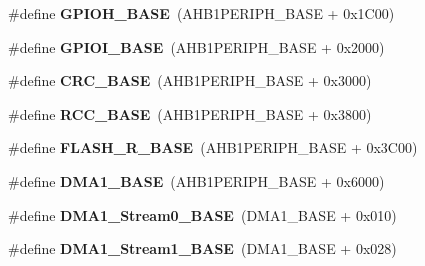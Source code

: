 \begin{DoxyCompactItemize}
\item 
\hypertarget{group___peripheral__memory__map_gaee4716389f3a1c727495375b76645608}{\#define {\bfseries G\-P\-I\-O\-H\-\_\-\-B\-A\-S\-E}~(A\-H\-B1\-P\-E\-R\-I\-P\-H\-\_\-\-B\-A\-S\-E + 0x1\-C00)}\label{group___peripheral__memory__map_gaee4716389f3a1c727495375b76645608}

\item 
\hypertarget{group___peripheral__memory__map_ga50acf918c2e1c4597d5ccfe25eb3ad3d}{\#define {\bfseries G\-P\-I\-O\-I\-\_\-\-B\-A\-S\-E}~(A\-H\-B1\-P\-E\-R\-I\-P\-H\-\_\-\-B\-A\-S\-E + 0x2000)}\label{group___peripheral__memory__map_ga50acf918c2e1c4597d5ccfe25eb3ad3d}

\item 
\hypertarget{group___peripheral__memory__map_ga656a447589e785594cbf2f45c835ad7e}{\#define {\bfseries C\-R\-C\-\_\-\-B\-A\-S\-E}~(A\-H\-B1\-P\-E\-R\-I\-P\-H\-\_\-\-B\-A\-S\-E + 0x3000)}\label{group___peripheral__memory__map_ga656a447589e785594cbf2f45c835ad7e}

\item 
\hypertarget{group___peripheral__memory__map_ga0e681b03f364532055d88f63fec0d99d}{\#define {\bfseries R\-C\-C\-\_\-\-B\-A\-S\-E}~(A\-H\-B1\-P\-E\-R\-I\-P\-H\-\_\-\-B\-A\-S\-E + 0x3800)}\label{group___peripheral__memory__map_ga0e681b03f364532055d88f63fec0d99d}

\item 
\hypertarget{group___peripheral__memory__map_ga8e21f4845015730c5731763169ec0e9b}{\#define {\bfseries F\-L\-A\-S\-H\-\_\-\-R\-\_\-\-B\-A\-S\-E}~(A\-H\-B1\-P\-E\-R\-I\-P\-H\-\_\-\-B\-A\-S\-E + 0x3\-C00)}\label{group___peripheral__memory__map_ga8e21f4845015730c5731763169ec0e9b}

\item 
\hypertarget{group___peripheral__memory__map_gab2d8a917a0e4ea99a22ac6ebf279bc72}{\#define {\bfseries D\-M\-A1\-\_\-\-B\-A\-S\-E}~(A\-H\-B1\-P\-E\-R\-I\-P\-H\-\_\-\-B\-A\-S\-E + 0x6000)}\label{group___peripheral__memory__map_gab2d8a917a0e4ea99a22ac6ebf279bc72}

\item 
\hypertarget{group___peripheral__memory__map_ga0d3c52aa35dcc68f78b704dfde57ba95}{\#define {\bfseries D\-M\-A1\-\_\-\-Stream0\-\_\-\-B\-A\-S\-E}~(D\-M\-A1\-\_\-\-B\-A\-S\-E + 0x010)}\label{group___peripheral__memory__map_ga0d3c52aa35dcc68f78b704dfde57ba95}

\item 
\hypertarget{group___peripheral__memory__map_ga5b4152cef577e37eccc9311d8bdbf3c2}{\#define {\bfseries D\-M\-A1\-\_\-\-Stream1\-\_\-\-B\-A\-S\-E}~(D\-M\-A1\-\_\-\-B\-A\-S\-E + 0x028)}\label{group___peripheral__memory__map_ga5b4152cef577e37eccc9311d8bdbf3c2}


\end{DoxyCompactItemize}
